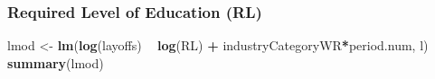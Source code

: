 \documentclass[
]{article}
\newenvironment{Shaded}{\begin{snugshade}}{\end{snugshade}}
\newcommand{\KeywordTok}[1]{\textcolor[rgb]{0.13,0.29,0.53}{\textbf{#1}}}
\newcommand{\NormalTok}[1]{#1}
\newcommand{\OperatorTok}[1]{\textcolor[rgb]{0.81,0.36,0.00}{\textbf{#1}}}
\newcommand{\StringTok}[1]{\textcolor[rgb]{0.31,0.60,0.02}{#1}}
\begin{document}
\hypertarget{required-level-of-education-rl-3}{%
\subsubsection{Required Level of Education
(RL)}\label{required-level-of-education-rl-3}}

\begin{Shaded}
\begin{Highlighting}[]
\NormalTok{lmod <-}\StringTok{ }\KeywordTok{lm}\NormalTok{(}\KeywordTok{log}\NormalTok{(layoffs) }\OperatorTok{~}\StringTok{ }\KeywordTok{log}\NormalTok{(RL) }\OperatorTok{+}\StringTok{ }\NormalTok{industryCategoryWR}\OperatorTok{*}\NormalTok{period.num, l)}
\KeywordTok{summary}\NormalTok{(lmod)}
\end{Highlighting}
\end{Shaded}
\end{document}
